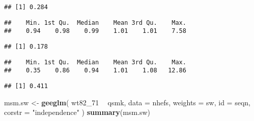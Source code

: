 \documentclass[10pt,]{book}
\newenvironment{Shaded}{\begin{snugshade}}{\end{snugshade}}
\newcommand{\DataTypeTok}[1]{\textcolor[rgb]{0.13,0.29,0.53}{#1}}
\newcommand{\DecValTok}[1]{\textcolor[rgb]{0.00,0.00,0.81}{#1}}
\newcommand{\KeywordTok}[1]{\textcolor[rgb]{0.13,0.29,0.53}{\textbf{#1}}}
\newcommand{\NormalTok}[1]{#1}
\newcommand{\OperatorTok}[1]{\textcolor[rgb]{0.81,0.36,0.00}{\textbf{#1}}}
\newcommand{\StringTok}[1]{\textcolor[rgb]{0.31,0.60,0.02}{#1}}
\begin{document}
\begin{verbatim}
## [1] 0.284
\end{verbatim}

\begin{Shaded}
\end{Shaded}

\begin{verbatim}
##    Min. 1st Qu.  Median    Mean 3rd Qu.    Max. 
##    0.94    0.98    0.99    1.01    1.01    7.58
\end{verbatim}

\begin{Shaded}
\end{Shaded}

\begin{verbatim}
## [1] 0.178
\end{verbatim}

\begin{Shaded}
\end{Shaded}

\begin{verbatim}
##    Min. 1st Qu.  Median    Mean 3rd Qu.    Max. 
##    0.35    0.86    0.94    1.01    1.08   12.86
\end{verbatim}

\begin{Shaded}
\end{Shaded}

\begin{verbatim}
## [1] 0.411
\end{verbatim}

\begin{Shaded}
\begin{Highlighting}[]
\NormalTok{msm.sw <-}\StringTok{ }\KeywordTok{geeglm}\NormalTok{(}
\NormalTok{  wt82_}\DecValTok{71} \OperatorTok{~}\StringTok{ }\NormalTok{qsmk,}
  \DataTypeTok{data =}\NormalTok{ nhefs,}
  \DataTypeTok{weights =}\NormalTok{ sw,}
  \DataTypeTok{id =}\NormalTok{ seqn,}
  \DataTypeTok{corstr =} \StringTok{"independence"}
\NormalTok{)}
\KeywordTok{summary}\NormalTok{(msm.sw)}
\end{Highlighting}
\end{Shaded}
\end{document}
